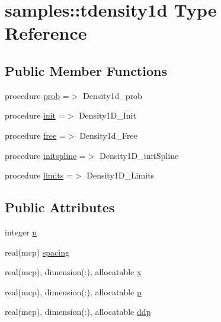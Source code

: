 \hypertarget{structsamples_1_1tdensity1d}{}\section{samples\+:\+:tdensity1d Type Reference}
\label{structsamples_1_1tdensity1d}
\subsection*{Public Member Functions}
\begin{DoxyCompactItemize}
\item 
procedure \mbox{\hyperlink{structsamples_1_1tdensity1d_a7ac22a9053b7bc9bf5667fe9f1da889f}{prob}} =$>$ Density1d\+\_\+prob
\item 
procedure \mbox{\hyperlink{structsamples_1_1tdensity1d_af83fed6181745353d8bc17521ef05720}{init}} =$>$ Density1\+D\+\_\+\+Init
\item 
procedure \mbox{\hyperlink{structsamples_1_1tdensity1d_ad13a23b22f9a468fdd058706b7d4e4b5}{free}} =$>$ Density1d\+\_\+\+Free
\item 
procedure \mbox{\hyperlink{structsamples_1_1tdensity1d_a3add7bd22ae9197f0669de46fc431d66}{initspline}} =$>$ Density1\+D\+\_\+init\+Spline
\item 
procedure \mbox{\hyperlink{structsamples_1_1tdensity1d_a7c048202ee31dd599ca78496a275b993}{limits}} =$>$ Density1\+D\+\_\+\+Limits
\end{DoxyCompactItemize}
\subsection*{Public Attributes}
\begin{DoxyCompactItemize}
\item 
integer \mbox{\hyperlink{structsamples_1_1tdensity1d_a5662dfb72ed4b1da1c667d3d2a013573}{n}}
\item 
real(mcp) \mbox{\hyperlink{structsamples_1_1tdensity1d_a61e4f6925a3999752f32466fa42d510a}{spacing}}
\item 
real(mcp), dimension(\+:), allocatable \mbox{\hyperlink{structsamples_1_1tdensity1d_a9e769878fd6119f5571ffd04911dd348}{x}}
\item 
real(mcp), dimension(\+:), allocatable \mbox{\hyperlink{structsamples_1_1tdensity1d_a0d8e56ff768b27935b7a81a4138479fb}{p}}
\item 
real(mcp), dimension(\+:), allocatable \mbox{\hyperlink{structsamples_1_1tdensity1d_a7ed3bbeb3bb89bebd952925095962368}{ddp}}
\end{DoxyCompactItemize}


